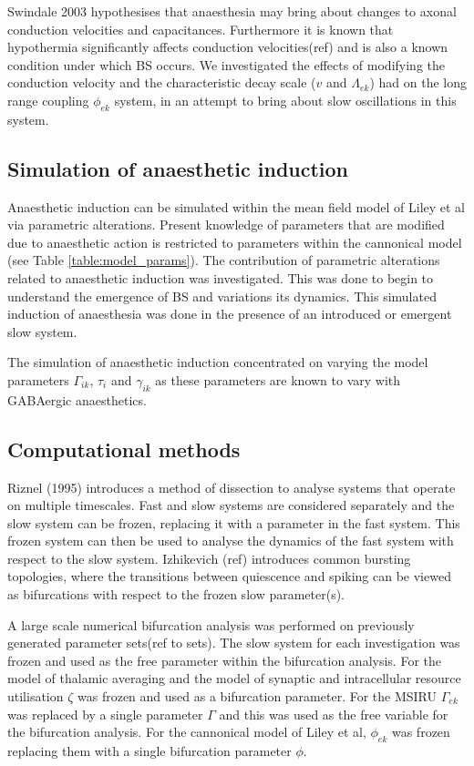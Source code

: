 \documentclass[a4paper,12pt]{article}
\begin{document}
Swindale 2003 hypothesises that anaesthesia may bring about changes to axonal conduction velocities and capacitances. Furthermore it is known that hypothermia significantly affects conduction velocities(ref) and is also a known condition under which BS occurs. We investigated the
effects of modifying the conduction velocity and the characteristic decay scale ($v$ and $\Lambda_{ek}$) had on the
long range coupling $\phi_{ek}$ system, in an attempt to bring about slow oscillations in this system.

\subsection{Simulation of anaesthetic induction}
Anaesthetic induction can be simulated within the mean field model of Liley et al via parametric alterations. Present knowledge of parameters that are modified due to anaesthetic action is restricted to parameters within the cannonical model (see Table \ref{table:model_params}). The contribution of parametric alterations related to anaesthetic induction was investigated. This was done to begin to understand the emergence of BS and variations its dynamics. This simulated induction of anaesthesia was done in the presence of an introduced or emergent slow system.

The simulation of anaesthetic induction concentrated on varying the model parameters $\Gamma_{ik}$, $\tau_i$ and $\gamma_{ik}$ as these parameters are known to vary with GABAergic anaesthetics. 

\subsection{Computational methods}
Riznel (1995) introduces a method of dissection to analyse systems that operate on multiple timescales. Fast and slow systems are considered separately and the slow system can be frozen, replacing it with a parameter in the fast system. This frozen system can then be used to analyse the dynamics of the fast system with respect to the slow system. Izhikevich (ref) introduces common bursting topologies, where the transitions between quiescence and spiking can be viewed as bifurcations with respect to the frozen slow parameter(s).

A large scale numerical bifurcation analysis was performed on previously generated parameter sets(ref to sets). The slow system for each investigation was frozen and used as the free parameter within the bifurcation analysis. For the model of thalamic averaging and the model of synaptic and intracellular resource utilisation $\zeta$ was frozen and used as a bifurcation parameter. For the MSIRU $\Gamma_{ek}$ was replaced by a single parameter $\Gamma$ and this was used as the free variable for the bifurcation analysis. For the cannonical model of Liley et al, $\phi_{ek}$ was frozen replacing them with a single bifurcation parameter $\phi$.
\end{document}
